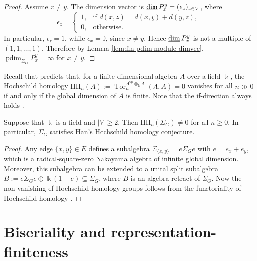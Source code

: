 \documentclass[a4paper,leqno]{amsart}
\begin{document}
\begin{proof}
Assume $x\neq y$. The dimension vector is $\operatorname{\underline{dim}} P_x^y=(\epsilon_z)_{z\in V}$, where
$$
\epsilon_z=
\begin{cases}
1, & \text{if } d(x,z)=d(x,y)+d(y,z),\\
0, & \text{otherwise}.
\end{cases}
$$
In particular, $\epsilon_y=1$, while $\epsilon_x=0$, since $x\neq y$. Hence $\operatorname{\underline{dim}} P_x^y$ is not a multiple of $(1,1,\dots,1)$. Therefore by Lemma \ref{lem:fin pdim module dimvec}, $\operatorname{pdim}_{\Sigma_G} P_x^y=\infty$ for $x\neq y$.
\end{proof}



Recall that  \cite{Han06} predicts that, for a finite-dimensional algebra $A$ over a field $\Bbbk$, the Hochschild homology $\mathrm{HH}_n(A):=\operatorname{Tor}_n^{A^{\operatorname{op}}\otimes_\Bbbk A}(A,A)=0$ vanishes for all $n\gg 0$ if and only if the global dimension of $A$ is finite.  Note that the if-direction always holds \cite[Proposition 3.3]{Han06}.

\begin{prop}
Suppose that $\Bbbk$ is a field and $|V|\ge 2$.  Then $\mathrm{HH}_n(\Sigma_G)\neq 0$ for all $n\geq 0$.  In particular, $\Sigma_G$ satisfies Han's Hochschild homology conjecture.
\end{prop}
\begin{proof}
Any edge $\{x,y\}\in E$ defines a subalgebra $\Sigma_{\{x,y\}} = e\Sigma_Ge$ with $e=e_x+e_y$, which is a radical-square-zero Nakayama algebra of infinite global dimension.
Moreover, this subalgebra can be extended to a unital split subalgebra $B:=e\Sigma_Ge\oplus \Bbbk(1-e)\subseteq \Sigma_G$, where $B$ is an algebra retract of $\Sigma_G$.  
Now the non-vanishing of Hochschild homology groups follows from the functoriality of Hochschild homology \cite{Lod98,BM10}. 
\end{proof}




\section{Biseriality and representation-finiteness}\label{sec:biserial}
\end{document}
